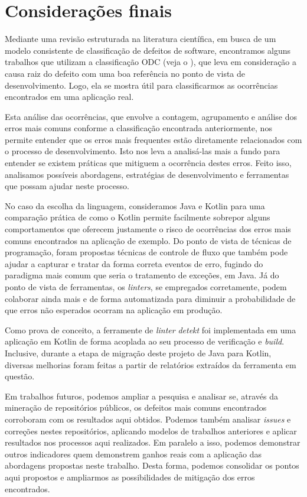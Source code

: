 \chapter{Considerações finais}\label{cap:final_considerations}

Mediante uma revisão estruturada na literatura científica, em busca de um modelo consistente de classificação de defeitos de software, encontramos alguns trabalhos que utilizam a classificação ODC (veja o ), que leva em consideração a causa raiz do defeito com uma boa referência no ponto de vista de desenvolvimento. Logo, ela se mostra útil para classificarmos as ocorrências encontrados em uma aplicação real.

Esta análise das ocorrências, que envolve a contagem, agrupamento e análise dos erros mais comuns conforme a classificação encontrada anteriormente, nos permite entender que os erros mais frequentes estão diretamente relacionados com o processo de desenvolvimento. Isto nos leva a analisá-las mais a fundo para entender se existem práticas que mitiguem a ocorrência destes erros. Feito isso, analisamos possíveis abordagens, estratégias de desenvolvimento e ferramentas que possam ajudar neste processo.

No caso da escolha da linguagem, consideramos Java e Kotlin para uma comparação prática de como o Kotlin permite facilmente sobrepor alguns comportamentos que oferecem justamente o risco de ocorrências dos erros mais comuns encontrados na aplicação de exemplo. Do ponto de vista de técnicas de programação, foram propostas técnicas de controle de fluxo que também pode ajudar a capturar e tratar da forma correta eventos de erro, fugindo do paradigma mais comum que seria o tratamento de exceções, em Java. Já do ponto de vista de ferramentas, os \textit{linters}, se empregados corretamente, podem colaborar ainda mais e de forma automatizada para diminuir a probabilidade de que erros não esperados ocorram na aplicação em produção.

Como prova de conceito, a ferramente de \textit{linter} \textit{detekt} foi implementada em uma aplicação em Kotlin de forma acoplada ao seu processo de verificação e \textit{build}. Inclusive, durante a etapa de migração deste projeto de Java para Kotlin, diversas melhorias foram feitas a partir de relatórios extraídos da ferramenta em questão.

Em trabalhos futuros, podemos ampliar a pesquisa e analisar se, através da mineração de repositórios públicos, os defeitos mais comuns encontrados corroboram com os resultados aqui obtidos. Podemos também analisar \textit{issues} e correções nestes repositórios, aplicando modelos de trabalhos anteriores e aplicar resultados nos processos aqui realizados. Em paralelo a isso, podemos demonstrar outros indicadores quem demonstrem ganhos reais com a aplicação das abordagens propostas neste trabalho. Desta forma, podemos consolidar os pontos aqui propostos e ampliarmos as possibilidades de mitigação dos erros encontrados.

